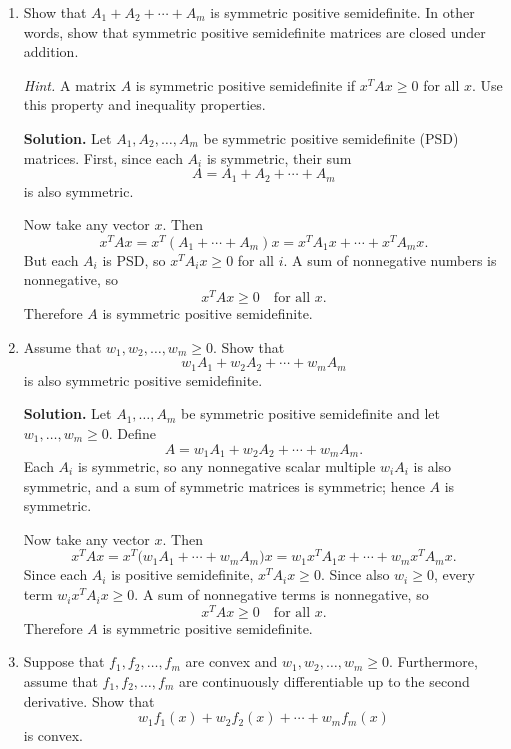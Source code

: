 \documentclass[11pt]{article}
\begin{document}
	\begin{enumerate}[label=\textbf{(\alph*)}, leftmargin=1.2cm]
		\item Show that $A_1 + A_2 + \cdots + A_m$ is symmetric positive semidefinite. In other words, show that symmetric positive semidefinite matrices are closed under addition.
		
		\noindent\textit{Hint.} A matrix $A$ is symmetric positive semidefinite if $x^T A x \ge 0$ for all $x$. Use this property and inequality properties.
		
		\noindent\textbf{Solution.}
		Let $A_1, A_2, \dots, A_m$ be symmetric positive semidefinite (PSD) matrices. First, since each $A_i$ is symmetric, their sum
		\[
		A = A_1 + A_2 + \cdots + A_m
		\]
		is also symmetric.
		
		Now take any vector $x$. Then
		\[
		x^T A x = x^T (A_1 + \cdots + A_m) x
		= x^T A_1 x + \cdots + x^T A_m x.
		\]
		But each $A_i$ is PSD, so $x^T A_i x \ge 0$ for all $i$. A sum of nonnegative numbers is nonnegative, so
		\[
		x^T A x \ge 0 \quad \text{for all } x.
		\]
		Therefore $A$ is symmetric positive semidefinite.
		
		\item Assume that $w_1, w_2, \dots, w_m \ge 0$. Show that
		\[
		w_1 A_1 + w_2 A_2 + \cdots + w_m A_m
		\]
		is also symmetric positive semidefinite.
		
		\noindent\textbf{Solution.}
		Let $A_1, \dots, A_m$ be symmetric positive semidefinite and let $w_1, \dots, w_m \ge 0$. Define
		\[
		A = w_1 A_1 + w_2 A_2 + \cdots + w_m A_m.
		\]
		Each $A_i$ is symmetric, so any nonnegative scalar multiple $w_i A_i$ is also symmetric, and a sum of symmetric matrices is symmetric; hence $A$ is symmetric.
		
		Now take any vector $x$. Then
		\[
		x^T A x = x^T \bigl( w_1 A_1 + \cdots + w_m A_m \bigr) x
		= w_1 x^T A_1 x + \cdots + w_m x^T A_m x.
		\]
		Since each $A_i$ is positive semidefinite, $x^T A_i x \ge 0$. Since also $w_i \ge 0$, every term $w_i x^T A_i x \ge 0$. A sum of nonnegative terms is nonnegative, so
		\[
		x^T A x \ge 0 \quad \text{for all } x.
		\]
		Therefore $A$ is symmetric positive semidefinite.
		
		\item Suppose that $f_1, f_2, \dots, f_m$ are convex and $w_1, w_2, \dots, w_m \ge 0$. Furthermore, assume that $f_1, f_2, \dots, f_m$ are continuously differentiable up to the second derivative. Show that
		\[
		w_1 f_1(x) + w_2 f_2(x) + \cdots + w_m f_m(x)
		\]
		is convex.
		

\end{enumerate}
\end{document}
